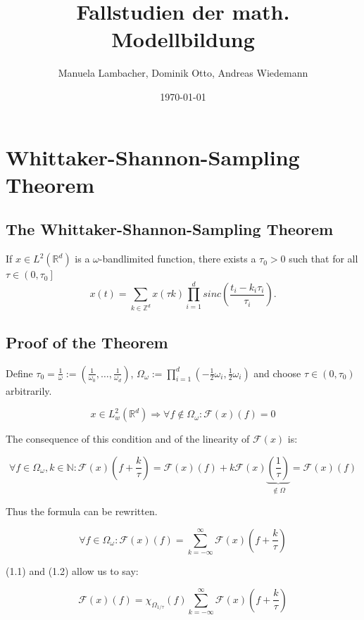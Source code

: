 \documentclass[a4paper, 11pt]{scrreprt}
\title{Fallstudien der math. Modellbildung}
\author{Manuela Lambacher, Dominik Otto, Andreas Wiedemann}
\date{\today}
\newcommand{\RR}{\mathbb{R}}
\newcommand{\ZZ}{\mathbb{Z}}
\newcommand{\NN}{\mathbb{N}}
\newcommand{\FF}{\mathcal{F}}
\begin{document}
\parindent 0pt
\maketitle
\tableofcontents

\chapter{Whittaker-Shannon-Sampling Theorem}

\section{The Whittaker-Shannon-Sampling Theorem}
If \(x \in L^2(\RR^d)\) is a \(\omega\)-bandlimited function, there exists a \(\tau_0 > 0\) such that for all \(\tau \in \left(0,\tau_0\right]\)
\[x(t) = \sum_{k \in \ZZ^d} x(\tau k) \prod_{i=1}^d sinc\left(\frac{t_i-k_i \tau_i}{\tau_i}\right).\]

\section{Proof of the Theorem}
Define \(\tau_0 = \frac{1}{\omega} := \left(\frac{1}{\omega_0}, \ldots, \frac{1}{\omega_d}\right)\), \(\Omega_{\omega} := \prod_{i=1}^d \left(-\frac{1}{2}\omega_i ,\frac{1}{2}\omega_i\right)\) and choose \(\tau \in (0,\tau_0)\) arbitrarily.

\begin{equation}
x \in L^2_w(\RR^d) \Rightarrow \forall f\notin \Omega_{\omega}: \FF(x)(f) = 0
\end{equation}

The consequence of this condition and of the linearity of \(\FF(x)\) is:

\[\forall f\in \Omega_{\omega}, k \in \NN: \FF(x)\left(f+\frac{k}{\tau}\right) = \FF(x)(f) + k \FF(x)\underbrace{\left(\frac{1}{\tau}\right)}_{\notin \Omega} = \FF(x)(f)\]

Thus the formula can be rewritten.

\begin{equation}
\forall f \in \Omega_{\omega}: \FF(x)(f) = \sum_{k=-\infty}^\infty \FF(x)\left( f+\frac{k}{\tau}\right)
\end{equation} 

(1.1) and (1.2) allow us to say:

\[\FF(x)(f) = \chi_{\Omega_{1/\tau}}(f) \sum_{k=-\infty}^\infty \FF(x)\left(f+\frac{k}{\tau}\right)\]
\end{document}
